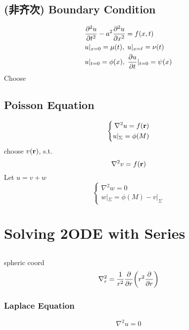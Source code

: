 \documentclass[UTF8]{ctexart} %
\numberwithin{equation}{section}
\begin{document}
\subsection{(非齐次) Boundary Condition}
\begin{equation}\label{key}
\begin{aligned}
&\pdv[2]{u}{t} - a^2\pdv[2]{u}{x} = f(x,t)\\
&u|_{x=0} = \mu(t),\; u|_{x=\ell} = \nu(t)\\
&u|_{t=0} = \phi(x),\; \pdv{u}{t}|_{t=0} = \psi(x)
\end{aligned}
\end{equation}
Choose 

\subsection{Poisson Equation}
\begin{equation}\label{key}
\left\{\begin{aligned}
\nabla^2 u = f(\vb{r})\\
u|_\Sigma = \phi(M)
\end{aligned}\right.
\end{equation}
choose $v(\vb{r})$, s.t.
\begin{equation}\label{key}
\nabla^2 v = f(\vb{r})
\end{equation}
Let $u = v + w$
\begin{equation}\label{key}
\left\{\begin{aligned}
\nabla^2 w = 0\\
w|_\Sigma = \phi(M) - v|_\Sigma
\end{aligned}\right.
\end{equation}

\section{Solving 2\textdegree ODE with Series}
\subsection{}
spheric coord
\begin{equation}\label{key}
\nabla^2_r = \dfrac{1}{r^2}\pdv{r}\qty(r^2\pdv{r})
\end{equation}

\subsubsection{Laplace Equation}
\begin{equation}\label{key}
\nabla^2 u = 0
\end{equation}
\end{document}
